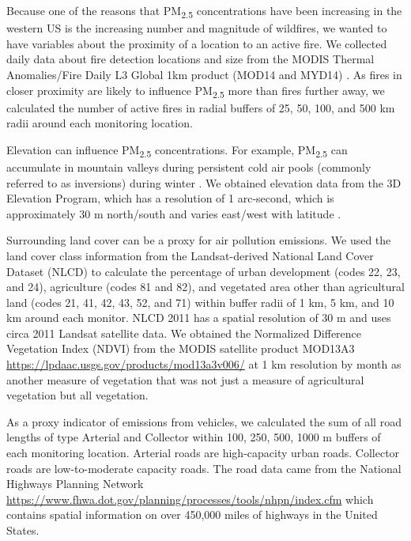 \documentclass[english]{article}
\begin{document}
Because one of the reasons that PM\textsubscript{2.5} concentrations have been increasing in the western US is the increasing number and magnitude of wildfires, we wanted to have variables about the proximity of a location to an active fire. 
We collected daily data about fire detection locations and size from the MODIS Thermal Anomalies/Fire Daily L3 Global 1km product (MOD14 and MYD14) \cite{Giglio2006,Hawbaker2017}. 
As fires in closer proximity are likely to influence PM\textsubscript{2.5} more than fires further away, we calculated the number of active fires in radial buffers of 25, 50, 100, and 500 km radii around each monitoring location. 

Elevation can influence PM\textsubscript{2.5} concentrations. For example, PM\textsubscript{2.5} can accumulate in mountain valleys during persistent cold air pools (commonly referred to as inversions) 
during winter \cite{Whiteman2014}. We obtained elevation data from the 3D Elevation Program, which has a resolution of 1 arc-second, which is approximately 30 m north/south and varies east/west with latitude \cite{USGSElevation2017}.

Surrounding land cover can be a proxy for air pollution emissions. We used the land cover class information from the Landsat-derived National Land Cover Dataset (NLCD) \cite{Homer2017} to calculate the percentage of urban development (codes 22, 23, and 24), agriculture (codes 81 and 82), and vegetated area other than agricultural land (codes 21, 41, 42, 43, 52, and 71) within buffer radii of 1 km, 5 km, and 10 km around each monitor. NLCD 2011 has a spatial resolution of 30 m and uses circa 2011 Landsat satellite data. We obtained the Normalized Difference Vegetation Index (NDVI) from the MODIS satellite product MOD13A3 \url{https://lpdaac.usgs.gov/products/mod13a3v006/} at 1 km resolution by month as another measure of vegetation that was not just a measure of agricultural vegetation but all vegetation. 

As a proxy indicator of emissions from vehicles, we calculated the sum of all road lengths of type Arterial and Collector within 100, 250, 500, 1000 m buffers of each monitoring location. Arterial roads are high-capacity urban roads. Collector roads are low-to-moderate capacity roads. The road data came from the National Highways Planning Network \url{https://www.fhwa.dot.gov/planning/processes/tools/nhpn/index.cfm} which contains spatial information on over 450,000 miles of highways in the United States. 
\end{document}
